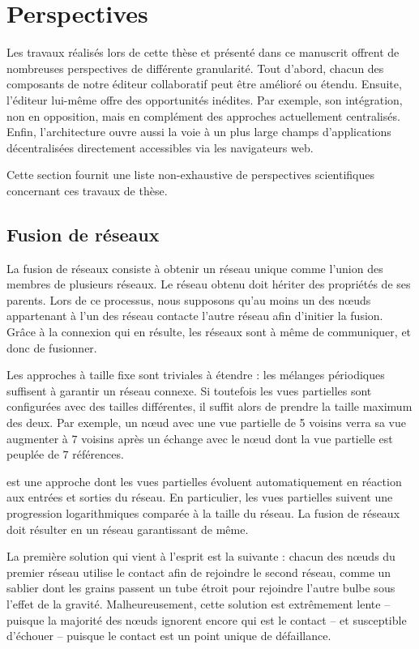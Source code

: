 
\section{Perspectives}
\label{conclu:sec:perspectives}

Les travaux réalisés lors de cette thèse et présenté dans ce manuscrit offrent
de nombreuses perspectives de différente granularité. Tout d'abord, chacun des
composants de notre éditeur collaboratif peut être amélioré ou étendu. Ensuite,
l'éditeur lui-même offre des opportunités inédites. Par exemple, son
intégration, non en opposition, mais en complément des approches actuellement
centralisés. Enfin, l'architecture ouvre aussi la voie à un plus large champs
d'applications décentralisées directement accessibles via les navigateurs web.

Cette section fournit une liste non-exhaustive de perspectives scientifiques
concernant ces travaux de thèse.

\subsection{Fusion de réseaux}

\label{conclu:subsec:merging}

La fusion de réseaux consiste à obtenir un réseau unique comme l'union des
membres de plusieurs réseaux. Le réseau obtenu doit hériter des propriétés de
ses parents.  Lors de ce processus, nous supposons qu'au moins un des nœuds
appartenant à l'un des réseau contacte l'autre réseau afin d'initier la
fusion. Grâce à la connexion qui en résulte, les réseaux sont à même de
communiquer, et donc de fusionner.

Les approches à taille fixe sont triviales à étendre : les mélanges périodiques
suffisent à garantir un réseau connexe. Si toutefois les vues partielles sont
configurées avec des tailles différentes, il suffit alors de prendre la taille
maximum des deux. Par exemple, un nœud avec une vue partielle de 5 voisins verra
sa vue augmenter à $7$ voisins après un échange avec le nœud dont la vue
partielle est peuplée de $7$ références.

\SPRAY est une approche dont les vues partielles évoluent automatiquement en
réaction aux entrées et sorties du réseau. En particulier, les vues partielles
suivent une progression logarithmiques comparée à la taille du réseau. La fusion
de réseaux \SPRAY doit résulter en un réseau \SPRAY garantissant de même.

La première solution qui vient à l'esprit est la suivante : chacun des nœuds du
premier réseau utilise le contact afin de rejoindre le second réseau, comme un
sablier dont les grains passent un tube étroit pour rejoindre l'autre bulbe sous
l'effet de la gravité. Malheureusement, cette solution est extrêmement lente --
puisque la majorité des nœuds ignorent encore qui est le contact -- et
susceptible d'échouer -- puisque le contact est un point unique de défaillance.

